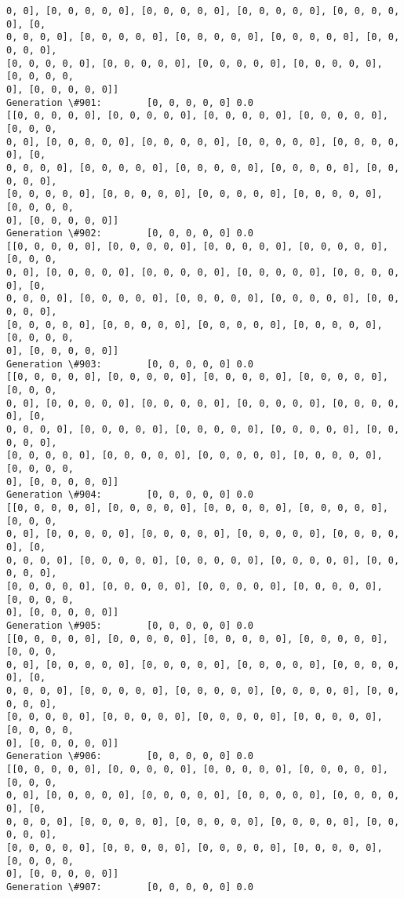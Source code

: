 \documentclass[11pt]{article}
\begin{document}
\begin{Verbatim}[commandchars=\\\{\}]
0, 0], [0, 0, 0, 0, 0], [0, 0, 0, 0, 0], [0, 0, 0, 0, 0], [0, 0, 0, 0, 0], [0,
0, 0, 0, 0], [0, 0, 0, 0, 0], [0, 0, 0, 0, 0], [0, 0, 0, 0, 0], [0, 0, 0, 0, 0],
[0, 0, 0, 0, 0], [0, 0, 0, 0, 0], [0, 0, 0, 0, 0], [0, 0, 0, 0, 0], [0, 0, 0, 0,
0], [0, 0, 0, 0, 0]]
Generation \#901:        [0, 0, 0, 0, 0] 0.0
[[0, 0, 0, 0, 0], [0, 0, 0, 0, 0], [0, 0, 0, 0, 0], [0, 0, 0, 0, 0], [0, 0, 0,
0, 0], [0, 0, 0, 0, 0], [0, 0, 0, 0, 0], [0, 0, 0, 0, 0], [0, 0, 0, 0, 0], [0,
0, 0, 0, 0], [0, 0, 0, 0, 0], [0, 0, 0, 0, 0], [0, 0, 0, 0, 0], [0, 0, 0, 0, 0],
[0, 0, 0, 0, 0], [0, 0, 0, 0, 0], [0, 0, 0, 0, 0], [0, 0, 0, 0, 0], [0, 0, 0, 0,
0], [0, 0, 0, 0, 0]]
Generation \#902:        [0, 0, 0, 0, 0] 0.0
[[0, 0, 0, 0, 0], [0, 0, 0, 0, 0], [0, 0, 0, 0, 0], [0, 0, 0, 0, 0], [0, 0, 0,
0, 0], [0, 0, 0, 0, 0], [0, 0, 0, 0, 0], [0, 0, 0, 0, 0], [0, 0, 0, 0, 0], [0,
0, 0, 0, 0], [0, 0, 0, 0, 0], [0, 0, 0, 0, 0], [0, 0, 0, 0, 0], [0, 0, 0, 0, 0],
[0, 0, 0, 0, 0], [0, 0, 0, 0, 0], [0, 0, 0, 0, 0], [0, 0, 0, 0, 0], [0, 0, 0, 0,
0], [0, 0, 0, 0, 0]]
Generation \#903:        [0, 0, 0, 0, 0] 0.0
[[0, 0, 0, 0, 0], [0, 0, 0, 0, 0], [0, 0, 0, 0, 0], [0, 0, 0, 0, 0], [0, 0, 0,
0, 0], [0, 0, 0, 0, 0], [0, 0, 0, 0, 0], [0, 0, 0, 0, 0], [0, 0, 0, 0, 0], [0,
0, 0, 0, 0], [0, 0, 0, 0, 0], [0, 0, 0, 0, 0], [0, 0, 0, 0, 0], [0, 0, 0, 0, 0],
[0, 0, 0, 0, 0], [0, 0, 0, 0, 0], [0, 0, 0, 0, 0], [0, 0, 0, 0, 0], [0, 0, 0, 0,
0], [0, 0, 0, 0, 0]]
Generation \#904:        [0, 0, 0, 0, 0] 0.0
[[0, 0, 0, 0, 0], [0, 0, 0, 0, 0], [0, 0, 0, 0, 0], [0, 0, 0, 0, 0], [0, 0, 0,
0, 0], [0, 0, 0, 0, 0], [0, 0, 0, 0, 0], [0, 0, 0, 0, 0], [0, 0, 0, 0, 0], [0,
0, 0, 0, 0], [0, 0, 0, 0, 0], [0, 0, 0, 0, 0], [0, 0, 0, 0, 0], [0, 0, 0, 0, 0],
[0, 0, 0, 0, 0], [0, 0, 0, 0, 0], [0, 0, 0, 0, 0], [0, 0, 0, 0, 0], [0, 0, 0, 0,
0], [0, 0, 0, 0, 0]]
Generation \#905:        [0, 0, 0, 0, 0] 0.0
[[0, 0, 0, 0, 0], [0, 0, 0, 0, 0], [0, 0, 0, 0, 0], [0, 0, 0, 0, 0], [0, 0, 0,
0, 0], [0, 0, 0, 0, 0], [0, 0, 0, 0, 0], [0, 0, 0, 0, 0], [0, 0, 0, 0, 0], [0,
0, 0, 0, 0], [0, 0, 0, 0, 0], [0, 0, 0, 0, 0], [0, 0, 0, 0, 0], [0, 0, 0, 0, 0],
[0, 0, 0, 0, 0], [0, 0, 0, 0, 0], [0, 0, 0, 0, 0], [0, 0, 0, 0, 0], [0, 0, 0, 0,
0], [0, 0, 0, 0, 0]]
Generation \#906:        [0, 0, 0, 0, 0] 0.0
[[0, 0, 0, 0, 0], [0, 0, 0, 0, 0], [0, 0, 0, 0, 0], [0, 0, 0, 0, 0], [0, 0, 0,
0, 0], [0, 0, 0, 0, 0], [0, 0, 0, 0, 0], [0, 0, 0, 0, 0], [0, 0, 0, 0, 0], [0,
0, 0, 0, 0], [0, 0, 0, 0, 0], [0, 0, 0, 0, 0], [0, 0, 0, 0, 0], [0, 0, 0, 0, 0],
[0, 0, 0, 0, 0], [0, 0, 0, 0, 0], [0, 0, 0, 0, 0], [0, 0, 0, 0, 0], [0, 0, 0, 0,
0], [0, 0, 0, 0, 0]]
Generation \#907:        [0, 0, 0, 0, 0] 0.0

\end{Verbatim}
\end{document}
